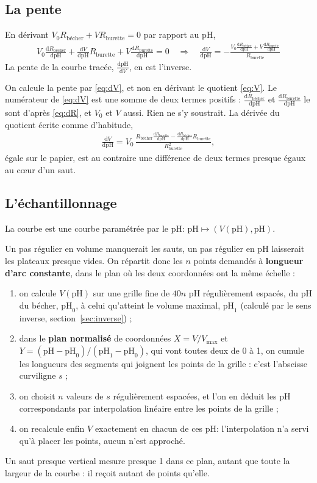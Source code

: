 \documentclass[a4paper,11pt]{article}
\newcommand\gras[1]{\textbf{#1}}
\newcommand\rsltm[1]{\boxed{#1}}
\newcommand\pH{\ensuremath{\mathrm{pH}}\xspace}
\newcommand\ddp[2]{\frac{\mathrm{d}#1}{\mathrm{d}#2}}
\newcommand\pare[1]{\left(#1\right)}
\newcommand\Rb{R_\text{bécher}}
\newcommand\Ru{R_\text{burette}}
\begin{document}
\subsection{La pente}
En dérivant $V_0\Rb+V\Ru=0$ par rapport au \pH,
\begin{align}
V_0\ddp\Rb\pH+\ddp V\pH\Ru+V\ddp\Ru\pH=0
\quad\Longrightarrow\quad
\rsltm{\ddp V\pH=-\frac{V_0\ddp\Rb\pH+V\ddp\Ru\pH}{\Ru}}
\label{eq:dV}
\end{align}
La pente de la courbe tracée, $\ddp\pH V$, en est l'inverse.
\begin{algo}
On calcule la pente par \eqref{eq:dV}, et non en dérivant le quotient \eqref{eq:V}.
Le numérateur de \eqref{eq:dV} est une somme de deux termes positifs : $\ddp\Rb\pH$ et $\ddp\Ru\pH$ le sont d'après \eqref{eq:dR}, et $V_0$ et $V$ aussi.
Rien ne s'y soustrait.
La dérivée du quotient écrite comme d'habitude,
\begin{align}
\ddp V\pH=V_0\,\frac{\Rb\ddp\Ru\pH-\ddp\Rb\pH\Ru}{\Ru^2},
\end{align}
égale sur le papier, est au contraire une différence de deux termes presque égaux au cœur d'un saut.
\end{algo}

\subsection{L'échantillonnage}\label{sec:echantillonnage}
La courbe est une courbe paramétrée par le \pH : $\pH\mapsto\pare{V(\pH),\pH}$.
\begin{algo}
Un pas régulier en volume manquerait les sauts, un pas régulier en \pH laisserait les plateaux presque vides.
On répartit donc les $n$ points demandés à \gras{longueur d'arc constante}, dans le plan où les deux coordonnées ont la même échelle :
\begin{enumerate}
\item on calcule $V(\pH)$ sur une grille fine de $40n$ \pH régulièrement espacés, du \pH du bécher, $\pH_0$, à celui qu'atteint le volume maximal, $\pH_1$ (calculé par le sens inverse, section~\ref{sec:inverse}) ;
\item dans le \gras{plan normalisé} de coordonnées $X=V/V_\text{max}$ et $Y=(\pH-\pH_0)/(\pH_1-\pH_0)$, qui vont toutes deux de 0 à 1, on cumule les longueurs des segments qui joignent les points de la grille : c'est l'abscisse curviligne $s$ ;
\item on choisit $n$ valeurs de $s$ régulièrement espacées, et l'on en déduit les \pH correspondants par interpolation linéaire entre les points de la grille ;
\item on recalcule enfin $V$ exactement en chacun de ces \pH : l'interpolation n'a servi qu'à placer les points, aucun n'est approché.
\end{enumerate}
Un saut presque vertical mesure presque 1 dans ce plan, autant que toute la largeur de la courbe : il reçoit autant de points qu'elle.
\end{algo}
\end{document}
